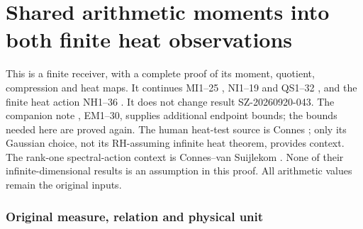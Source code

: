 

\clearpage\begingroup
\part*{Shared arithmetic moments into both finite heat observations}
\newcommand{\hrvC}{\mathbb C}\newcommand{\hrvR}{\mathbb R}
\newcommand{\hrvtr}{\operatorname{tr}}\newcommand{\hrvdd}{\dagger_G}
\newcommand{\hrvnorm}[1]{\left\lVert#1\right\rVert}
\newtheorem{hrvtheorem}{Theorem}


This is a finite receiver, with a complete proof of its moment, quotient,
compression and heat maps. It continues MI1--25 \cite{hrv:MI}, NI1--19 and
QS1--32 \cite{hrv:NI}, and the finite heat action NH1--36 \cite{hrv:NH}.
It does not change result SZ-20260920-043. The companion note
, EM1--30,
supplies additional endpoint bounds; the bounds needed here are proved
again. The human heat-test source is Connes \cite{hrv:Connes}; only its
Gaussian choice, not its RH-assuming infinite heat theorem, provides
context. The rank-one spectral-action context is Connes--van Suijlekom
\cite{hrv:CV}. None of their infinite-dimensional results is an assumption
in this proof. All arithmetic values remain the original inputs.

\section{Original measure, relation and physical unit}

